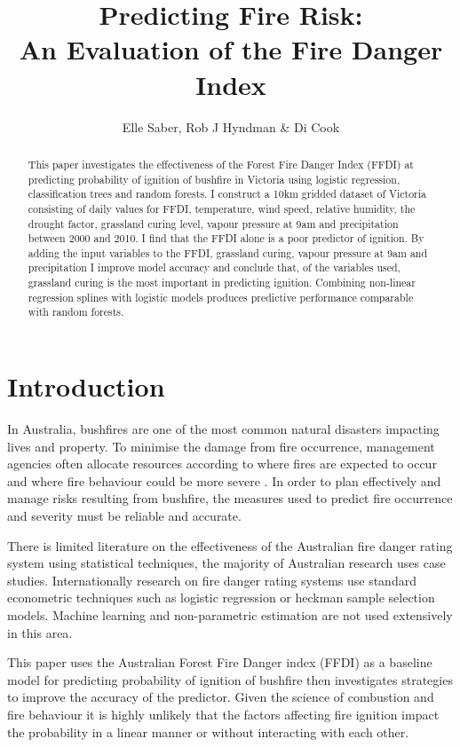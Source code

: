 \documentclass[11pt,a4paper]{article}
\title{Predicting Fire Risk: \\ An Evaluation of the Fire Danger Index}
\author{Elle Saber, Rob J Hyndman \& Di Cook}
\begin{document}
\maketitle

\begin{abstract}
This paper investigates the effectiveness of the Forest Fire Danger Index (FFDI) \citep{mcarthur67} at predicting probability of ignition of bushfire in Victoria using logistic regression, classification trees and random forests. I construct a 10km gridded dataset of Victoria consisting of daily values for FFDI, temperature, wind speed, relative humidity, the drought factor, grassland curing level, vapour pressure at 9am and precipitation between 2000 and 2010. I find that the FFDI alone is a poor predictor of ignition. By adding the input variables to the FFDI, grassland curing, vapour pressure at 9am and precipitation I improve model accuracy and conclude that, of the variables used, grassland curing is the most important in predicting ignition. Combining non-linear regression splines with logistic models produces predictive performance comparable with random forests. 
\end{abstract}

\section{Introduction}

In Australia, bushfires are one of the most common natural disasters impacting lives and property. To minimise the damage from fire occurrence, management agencies often allocate resources according to where fires are expected to occur and where fire behaviour could be more severe  \citep{padilla11, wotton05}. In order to plan effectively and manage risks resulting from bushfire, the measures used to predict fire occurrence and severity must be reliable and accurate.  

There is limited literature on the effectiveness of the Australian fire danger rating system using statistical techniques, the majority of Australian research uses case studies. Internationally research on fire danger rating systems use standard econometric techniques such as logistic regression or heckman sample selection models. Machine learning and non-parametric estimation are not used extensively in this area. 

This paper uses the Australian Forest Fire Danger index (FFDI) as a baseline model for predicting probability of ignition of bushfire then investigates strategies to improve the accuracy of the predictor. Given the science of combustion and fire behaviour it is highly unlikely that the factors affecting fire ignition impact the probability in a linear manner or without interacting with each other. 
\end{document}
